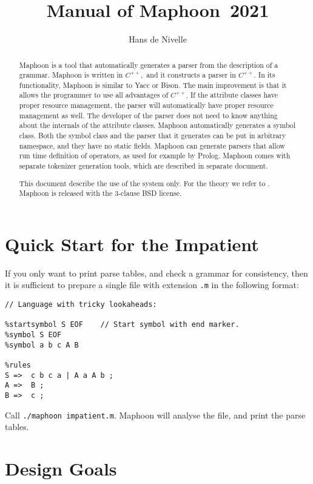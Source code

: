 \documentclass{article}
\title{Manual of Maphoon~2021}
\author{Hans de Nivelle}
\begin{document}
\maketitle
\begin{abstract}
   \noindent
   Maphoon is a tool that automatically generates a 
   parser from the description of a grammar. 
   Maphoon is written in $ C^{++}, $ and it constructs a parser 
   in $ C^{++}. $ 
   In its functionality, Maphoon is similar to Yacc or Bison.
   The main improvement is that it allows the programmer to 
   use all advantages of $ C^{++}. $ If the attribute classes
   have proper resource management, the parser will automatically
   have proper resource management as well. 
   The developer of the parser does not need to know
   anything about the internals of the attribute classes. 
   Maphoon automatically generates a symbol class.  
   Both the symbol class and the parser that it generates can be 
   put in arbitrary namespace, and they have no static fields.
   Maphoon can generate parsers that allow run time definition of operators,
   as used for example by Prolog.
   Maphoon comes with separate tokenizer generation tools, 
   which are described in separate document.

   \noindent
   This document describe the use of the system only. For the theory we
   refer to \cite{Dragon2007}.
   Maphoon is released with the 3-clause BSD license.
\end{abstract}

\section{Quick Start for the Impatient}

If you only want to print parse tables, and check a grammar
for consistency, then it is sufficient to prepare a single
file with extension \verb+.m+ in the following format: 
\begin{verbatim} 
// Language with tricky lookaheads:

%startsymbol S EOF    // Start symbol with end marker. 
%symbol S EOF
%symbol a b c A B

%rules
S =>  c b c a | A a A b ;
A =>  B ;
B =>  c ;  \end{verbatim}
Call \verb+./maphoon impatient.m+. 
Maphoon will analyse the file, and print the parse tables. 

\section{Design Goals}
\end{document}
